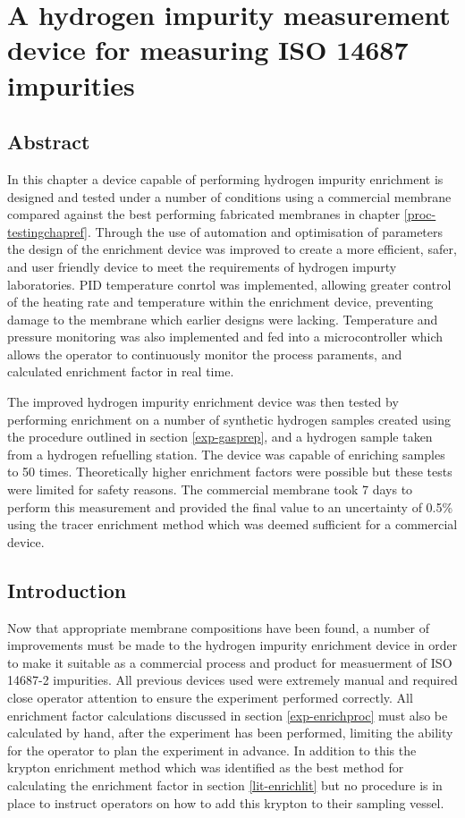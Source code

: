 \chapter{A hydrogen impurity measurement device for measuring ISO 14687 impurities}

\section*{Abstract}
In this chapter a device capable of performing hydrogen impurity enrichment is designed and tested under a number of conditions using a commercial membrane compared against the best performing fabricated membranes in chapter \ref{proc-testingchapref}. 
Through the use of automation and optimisation of parameters the design of the enrichment device was improved to create a more efficient, safer, and user friendly device to meet the requirements of hydrogen impurty laboratories. PID temperature conrtol was implemented, allowing greater control of the heating rate and temperature within the enrichment device, preventing damage to the membrane which earlier designs were lacking. Temperature and pressure monitoring was also implemented and fed into a microcontroller which allows the operator to continuously monitor the process paraments, and calculated enrichment factor in real time. 

The improved hydrogen impurity enrichment device was then tested by performing enrichment on a number of synthetic hydrogen samples created using the procedure outlined in section \ref{exp-gasprep}, and a hydrogen sample taken from a hydrogen refuelling station. The device was capable of enriching samples to 50 times. Theoretically higher enrichment factors were possible but these tests were limited for safety reasons. The commercial membrane took 7 days to perform this measurement and provided the final value to an uncertainty of 0.5\% using the tracer enrichment method which was deemed sufficient for a commercial device. 

\section{Introduction}
Now that appropriate membrane compositions have been found, a number of improvements must be made to the hydrogen impurity enrichment device in order to make it suitable as a commercial process and product for measuerment of ISO 14687-2 impurities. All previous devices used were extremely manual and required close operator attention to ensure the experiment performed correctly. All enrichment factor calculations discussed in section \ref{exp-enrichproc} must also be calculated by hand, after the experiment has been performed, limiting the ability for the operator to plan the experiment in advance. In addition to this the krypton enrichment method which was identified as the best method for calculating the enrichment factor in section \ref{lit-enrichlit} but no procedure is in place to instruct operators on how to add this krypton to their sampling vessel. 


